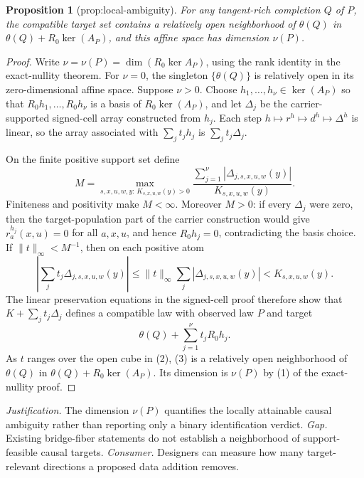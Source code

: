 \documentclass{article}
\newtheorem{proposition}{Proposition}
\begin{document}
\begin{proposition}[prop:local-ambiguity]\label{prop:local-ambiguity}
For any tangent-rich completion \(Q\) of \(P\), the compatible target set contains a relatively open neighborhood of \(\theta(Q)\) in \(\theta(Q)+R_0\ker(A_P)\), and this affine space has dimension \(\nu(P)\).
\end{proposition}
\begin{proof}
Write \(\nu=\nu(P)=\dim(R_0\ker A_P)\), using the rank identity in the exact-nullity theorem.  For \(\nu=0\), the singleton \(\{\theta(Q)\}\) is relatively open in its zero-dimensional affine space.  Suppose \(\nu>0\).  Choose \(h_1,\ldots,h_\nu\in\ker(A_P)\) so that \(R_0h_1,\ldots,R_0h_\nu\) is a basis of \(R_0\ker(A_P)\), and let \(\Delta_j\) be the carrier-supported signed-cell array constructed from \(h_j\).  Each step \(h\mapsto r^h\mapsto d^h\mapsto\Delta^h\) is linear, so the array associated with \(\sum_jt_jh_j\) is \(\sum_jt_j\Delta_j\).

On the finite positive support set define
\[
M=\max_{s,x,u,w,y:\,K_{s,x,u,w}(y)>0}
\frac{\sum_{j=1}^{\nu}|\Delta_{j,s,x,u,w}(y)|}{K_{s,x,u,w}(y)}.
\tag{1}
\]
Finiteness and positivity make \(M<\infty\).  Moreover \(M>0\): if every \(\Delta_j\) were zero, then the target-population part of the carrier construction would give \(r^{h_j}_a(x,u)=0\) for all \(a,x,u\), and hence \(R_0h_j=0\), contradicting the basis choice.  If \(\lVert t\rVert_\infty<M^{-1}\), then on each positive atom
\[
\left|\sum_jt_j\Delta_{j,s,x,u,w}(y)\right|
\le\lVert t\rVert_\infty\sum_j|\Delta_{j,s,x,u,w}(y)|
<K_{s,x,u,w}(y).
\tag{2}
\]
The linear preservation equations in the signed-cell proof therefore show that \(K+\sum_jt_j\Delta_j\) defines a compatible law with observed law \(P\) and target
\[
\theta(Q)+\sum_{j=1}^{\nu}t_jR_0h_j.
\tag{3}
\]
As \(t\) ranges over the open cube in (2), (3) is a relatively open neighborhood of \(\theta(Q)\) in \(\theta(Q)+R_0\ker(A_P)\).  Its dimension is \(\nu(P)\) by (1) of the exact-nullity proof.
\end{proof}
\par\smallskip\noindent \textit{Justification.} The dimension \(\nu(P)\) quantifies the locally attainable causal ambiguity rather than reporting only a binary identification verdict. \textit{Gap.} Existing bridge-fiber statements do not establish a neighborhood of support-feasible causal targets. \textit{Consumer.} Designers can measure how many target-relevant directions a proposed data addition removes.
\end{document}
